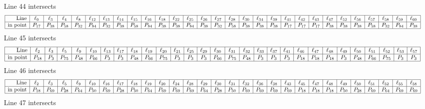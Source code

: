 \documentclass{article}
\begin{document}
{$$$$
Line 44 intersects 
$$
\begin{array}{|r*{28}{|c}|}
\hline
\mbox{Line}  & \ell_{0} & \ell_{3} & \ell_{4} & \ell_{8} & \ell_{12} & \ell_{13} & \ell_{14} & \ell_{15} & \ell_{16} & \ell_{18} & \ell_{22} & \ell_{25} & \ell_{26} & \ell_{27} & \ell_{28} & \ell_{30} & \ell_{34} & \ell_{39} & \ell_{41} & \ell_{42} & \ell_{43} & \ell_{47} & \ell_{52} & \ell_{56} & \ell_{57} & \ell_{58} & \ell_{59} & \ell_{60}\\
\hline
\mbox{in point}  & P_{17} & P_{38} & P_{58} & P_{32} & P_{84} & P_{32} & P_{38} & P_{58} & P_{84} & P_{38} & P_{38} & P_{84} & P_{38} & P_{32} & P_{58} & P_{38} & P_{38} & P_{38} & P_{17} & P_{17} & P_{17} & P_{38} & P_{38} & P_{38} & P_{58} & P_{32} & P_{84} & P_{38}\\
\hline
\end{array}
$$
Line 45 intersects 
$$
\begin{array}{|r*{28}{|c}|}
\hline
\mbox{Line}  & \ell_{2} & \ell_{3} & \ell_{5} & \ell_{9} & \ell_{10} & \ell_{13} & \ell_{17} & \ell_{18} & \ell_{19} & \ell_{20} & \ell_{21} & \ell_{25} & \ell_{29} & \ell_{30} & \ell_{31} & \ell_{32} & \ell_{33} & \ell_{37} & \ell_{41} & \ell_{46} & \ell_{47} & \ell_{48} & \ell_{49} & \ell_{50} & \ell_{51} & \ell_{52} & \ell_{53} & \ell_{57}\\
\hline
\mbox{in point}  & P_{18} & P_{3} & P_{75} & P_{48} & P_{66} & P_{3} & P_{3} & P_{48} & P_{66} & P_{75} & P_{3} & P_{3} & P_{3} & P_{66} & P_{75} & P_{48} & P_{3} & P_{3} & P_{3} & P_{18} & P_{18} & P_{18} & P_{3} & P_{48} & P_{66} & P_{75} & P_{3} & P_{3}\\
\hline
\end{array}
$$
Line 46 intersects 
$$
\begin{array}{|r*{28}{|c}|}
\hline
\mbox{Line}  & \ell_{2} & \ell_{3} & \ell_{5} & \ell_{9} & \ell_{10} & \ell_{16} & \ell_{17} & \ell_{18} & \ell_{19} & \ell_{20} & \ell_{24} & \ell_{28} & \ell_{29} & \ell_{30} & \ell_{31} & \ell_{32} & \ell_{36} & \ell_{38} & \ell_{43} & \ell_{45} & \ell_{47} & \ell_{48} & \ell_{49} & \ell_{50} & \ell_{51} & \ell_{52} & \ell_{55} & \ell_{58}\\
\hline
\mbox{in point}  & P_{18} & P_{69} & P_{28} & P_{64} & P_{50} & P_{69} & P_{28} & P_{50} & P_{64} & P_{69} & P_{69} & P_{69} & P_{64} & P_{28} & P_{50} & P_{69} & P_{69} & P_{69} & P_{69} & P_{18} & P_{18} & P_{18} & P_{50} & P_{28} & P_{69} & P_{64} & P_{69} & P_{69}\\
\hline
\end{array}
$$
Line 47 intersects 
}
\end{document}
